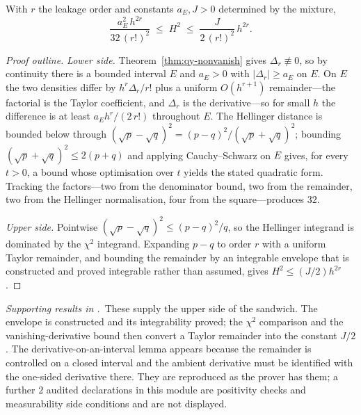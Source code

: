 \begin{theorem}
\label{thm:qy-sandwich}
With $r$ the leakage order and constants $a_{E},J>0$ determined by the mixture,
\begin{equation}
\frac{a_{E}^{2}\,h^{2r}}{32\,(r!)^{2}}\;\leq\;H^{2}\;\leq\;\frac{J}{2\,(r!)^{2}}\,h^{2r}.
\label{eq:qy-sandwich}
\end{equation}
\end{theorem}

\begin{proof}[Proof outline]
\emph{Lower side.} Theorem~\ref{thm:qy-nonvanish} gives $\Delta_{r}\not\equiv0$, so by
continuity there is a bounded interval $E$ and $a_{E}>0$ with $|\Delta_{r}|\ge a_{E}$ on
$E$. On $E$ the two densities differ by $h^{r}\Delta_{r}/r!$ plus a uniform $O(h^{r+1})$
remainder---the factorial is the Taylor coefficient, and $\Delta_{r}$ is the derivative---so
for small $h$ the difference is at least $a_{E}h^{r}/(2\,r!)$ throughout $E$. The
Hellinger distance is bounded below through
$(\sqrt{p}-\sqrt{q})^{2}=(p-q)^{2}/(\sqrt{p}+\sqrt{q})^{2}$; bounding
$(\sqrt{p}+\sqrt{q})^{2}\le2(p+q)$ and applying Cauchy--Schwarz on $E$ gives, for every
$t>0$, a bound whose optimisation over $t$ yields the stated quadratic form. Tracking the
factors---two from the denominator bound, two from the remainder, two from the Hellinger
normalisation, four from the square---produces $32$.

\emph{Upper side.} Pointwise $(\sqrt{p}-\sqrt{q})^{2}\le(p-q)^{2}/q$, so the Hellinger
integrand is dominated by the $\chi^{2}$ integrand. Expanding $p-q$ to order $r$ with a
uniform Taylor remainder, and bounding the remainder by an integrable envelope that is
constructed and proved integrable rather than assumed, gives $H^{2}\le(J/2)h^{2r}$.
\end{proof}


\noindent\emph{Supporting results in .}~These supply the upper side of the sandwich. The envelope is constructed and its integrability proved; the $\chi^{2}$ comparison and the vanishing-derivative bound then convert a Taylor remainder into the constant $J/2$. The derivative-on-an-interval lemma appears because the remainder is controlled on a closed interval and the ambient derivative must be identified with the one-sided derivative there. They are reproduced as the prover has them; a further $2$ audited declarations in this module are positivity checks and measurability side conditions and are not displayed.

